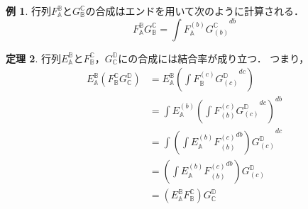 \documentclass[a4j,12pt]{jarticle}
\theoremstyle{definition}
\newtheorem{theorem}{定理}[section]
\newtheorem{example}[theorem]{例}
\numberwithin{equation}{section}
\newcommand{\CC}{\mathbb{C}}
\renewcommand{\AA}{\mathbb{A}}
\newcommand{\BB}{\mathbb{B}}
\newcommand{\DD}{\mathbb{D}}
\newcommand{\1}{\mathbb{1}}
\newcommand{\2}{\mathbb{2}}
\renewcommand{\.}{\hspace{2mm}}
\begin{document}
\begin{example}
  行列$F^\BB_\AA$と$G^\CC_\BB$の合成はエンドを用いて次のように計算される．
  \[
    F^\BB_\AA G^\CC_\BB = \int {F^{(b)}_\AA G^\CC_{(b)}}^{db}
  \]
\end{example}
\begin{theorem}
  行列$E_\AA^\BB$と$F_\BB^\CC$，$G_\CC^\DD$にの合成には結合率が成り立つ．
  つまり，
  \begin{align*}
    E_\AA^\BB (F_\BB^\CC G_\CC^\DD) &= E_\AA^\BB \left(\int {F_\BB^{(c)} G_{(c)}^\DD}^{dc}\right) \\
    &= \int E_\AA^{(b)} \left(\int {F_{(b)}^{(c)} G_{(c)}^\DD}^{dc}\right)^{db} \\
    &= \int {\left(\int {E_\AA^{(b)} F_{(b)}^{(c)}}^{db} \right) G_{(c)}^\DD}^{dc} \\
    &= \left(\int {E_\AA^{(b)} F_{(b)}^{(c)}}^{db} \right) G_{(c)}^\DD \\
    &= (E_\AA^\BB F_\BB^\CC) G_\CC^\DD
  \end{align*}
\end{theorem}
\end{document}
